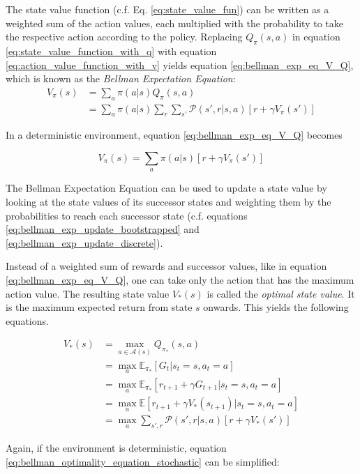The state value function (c.f. Eq. \ref{eq:state_value_fun}) can be written as a weighted sum of the action values, each multiplied with the probability to take the respective action according to the policy. Replacing $Q_\pi(s,a)$ in equation \ref{eq:state_value_function_with_q} with equation \ref{eq:action_value_function_with_v} yields equation \ref{eq:bellman_exp_eq_V_Q}, which is known as the \textit{Bellman Expectation Equation}:
\begin{align}
V_\pi(s)&=\sum_a \pi(a|s)Q_\pi(s,a)\\ &= \sum_a \pi(a|s)\sum_r \sum_{s'} \mathcal{P}(s',r|s,a)[r+\gamma V_{\pi}(s')]
\label{eq:bellman_exp_eq_V_Q}
\end{align}

In a deterministic environment, equation \ref{eq:bellman_exp_eq_V_Q} becomes

\begin{equation}
V_\pi(s)= \sum_a \pi(a|s)[r+\gamma V_{\pi}(s')]
\label{eq:bellman_exp_eq_V_determinisic}
\end{equation}

The Bellman Expectation Equation can be used to update a state value by looking at the state values of its successor states and weighting them by the probabilities to reach each successor state (c.f. equations \ref{eq:bellman_exp_update_bootstrapped} and \ref{eq:bellman_exp_update_discrete}).

Instead of a weighted sum of rewards and successor values, like in equation \ref{eq:bellman_exp_eq_V_Q}, one can take only the action that has the maximum action value. The resulting state value $V_*(s)$ is called the \textit{optimal state value}. It is the maximum expected return from state $s$ onwards. This yields the following equations. 

\begin{align}
V_*(s)&=\max_{a \in \mathcal{A}(s)} Q_{\pi_*}(s,a) \label{eq:bellman_optimality_equation_v_with_q}\\
&=\max_{a}\mathbb{E}_{\pi_*}[G_t|s_t=s,a_t=a]\\
&=\max_{a}\mathbb{E}_{\pi_*}[r_{t+1} + \gamma G_{t+1}|s_t=s,a_t=a]\\
&=\max_{a}\mathbb{E}[r_{t+1} + \gamma V_*(s_{t+1})|s_t=s,a_t=a]\\
&=\max_{a}\sum_{s',r}\mathcal{P}(s',r|s,a)[r + \gamma V_*(s')]
\label{eq:bellman_optimality_equation_stochastic}
\end{align}

Again, if the environment is deterministic, equation \ref{eq:bellman_optimality_equation_stochastic} can be simplified:


